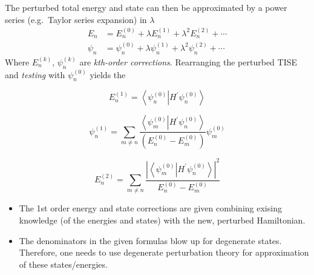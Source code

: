 The perturbed total energy and state can then be approximated by a power series (e.g.\ Taylor series expansion) in $\lambda$
\begin{align*}
    E_{n}    & =E_{n}^{(0)}+\lambda E_{n}^{(1)}+\lambda^{2}E_{n}^{(2)}+\cdots         \\
    \psi_{n} & =\psi_{n}^{(0)}+\lambda\psi_{n}^{(1)}+\lambda^{2}\psi_{n}^{(2)}+\cdots
\end{align*}
Where $E_{n}^{(k)}$, $\psi_{n}^{(k)}$ are \textit{kth-order  corrections}. Rearranging the perturbed TISE and \textit{testing} with $\psi_{n}^{(0)}$ yields the

\newpar{}
\begin{equation*}
    E_{n}^{(1)}=\left\langle\psi_{n}^{(0)}\right| H^{\prime} \left.\psi_{n}^{(0)}\right\rangle
\end{equation*}

\begin{equation*}
    \psi_{n}^{(1)}=\sum_{m\neq n}\frac{\left\langle\psi_{m}^{(0)}\right|H^{\prime}\left.\psi_{n}^{(0)}\right\rangle}{\left(E_{n}^{(0)}-E_{m}^{(0)}\right)}\psi_{m}^{(0)}
\end{equation*}

\begin{equation*}
    E_{n}^{(2)}=\sum_{m\neq n}\frac{\left|\left\langle\psi_{m}^{(0)}\right|H^{\prime}\left.\psi_{n}^{(0)}\right\rangle\right|^{2}}{E_{n}^{(0)}-E_{m}^{(0)}}
\end{equation*}

\newpar{}
\begin{itemize}
    \item The 1st order energy and state corrections are given combining exising knowledge (of the energies and states) with the new, perturbed Hamiltonian.
    \item The denominators in the given formulas blow up for degenerate states. Therefore, one needs to use degenerate perturbation theory for approximation of these states/energies.
\end{itemize}

